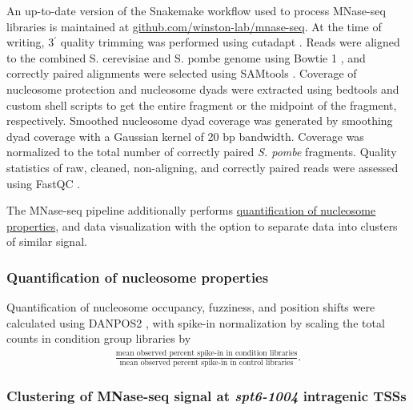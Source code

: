 An up-to-date version of the Snakemake \citep{koster2012} workflow used to process MNase-seq libraries is maintained at \href{https://github.com/winston-lab/mnase-seq}{github.com/winston-lab/mnase-seq}.
At the time of writing, 3$^\prime$ quality trimming was performed using cutadapt \citep{martin2011}.
Reads were aligned to the combined S. cerevisiae and S. pombe genome using Bowtie 1 \citep{langmead2009}, and correctly paired alignments were selected using SAMtools \citep{li2009}.
Coverage of nucleosome protection and nucleosome dyads were extracted using bedtools \citep{quinlan2010} and custom shell scripts to get the entire fragment or the midpoint of the fragment, respectively.
Smoothed nucleosome dyad coverage was generated by smoothing dyad coverage with a Gaussian kernel of 20 bp bandwidth.
Coverage was normalized to the total number of correctly paired \textit{S. pombe} fragments.
Quality statistics of raw, cleaned, non-aligning, and correctly paired reads were assessed using FastQC \citep{andrews2010}.

The MNase-seq pipeline additionally performs \hyperref[subsubsec:nucleosome_quantification]{quantification of nucleosome properties}, and data visualization with the option to separate data into clusters of similar signal.

\subsubsection{Quantification of nucleosome properties}
\label{subsubsec:nucleosome_quantification}
Quantification of nucleosome occupancy, fuzziness, and position shifts were calculated using DANPOS2 \citep{chen2013}, with spike-in normalization by scaling the total counts in condition group libraries by
\begin{align*}
    \frac{\text{mean observed percent spike-in in condition libraries}}{\text{mean observed percent spike-in in control libraries}}.
\end{align*}

\subsubsection{Clustering of MNase-seq signal at \textit{spt6-1004} intragenic TSSs}

